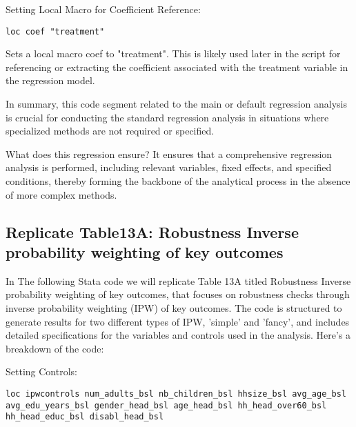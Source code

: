 \documentclass{article}
\begin{document}
\vspace{0.2cm}Setting Local Macro for Coefficient Reference:
\begin{mdframed}
\begin{verbatim}
loc coef "treatment"
\end{verbatim}
\end{mdframed}

\vspace{0.3cm}
Sets a local macro coef to "treatment". This is likely used later in the script for referencing or extracting the coefficient associated with the treatment variable in the regression model. \newline


In summary, this code segment related to the main or default regression analysis is crucial for conducting the standard regression analysis in situations where specialized methods are not required or specified.\newline

What does this regression ensure? \newline
It ensures that a comprehensive regression analysis is performed, including relevant variables, fixed effects, and specified conditions, thereby forming the backbone of the analytical process in the absence of more complex methods.

\subsection{Replicate Table13A: Robustness Inverse probability weighting of key outcomes}
\vspace{0.3cm} In The following Stata code we will replicate Table 13A titled Robustness Inverse probability weighting of key outcomes, that focuses on robustness checks through inverse probability weighting (IPW) of key outcomes. The code is structured to generate results for two different types of IPW, 'simple' and 'fancy', and includes detailed specifications for the variables and controls used in the analysis. \newline
Here's a breakdown of the code:

\vspace{0.2cm}Setting Controls:
\begin{mdframed}
\begin{verbatim}
loc ipwcontrols num_adults_bsl nb_children_bsl hhsize_bsl avg_age_bsl 
avg_edu_years_bsl gender_head_bsl age_head_bsl hh_head_over60_bsl 
hh_head_educ_bsl disabl_head_bsl
\end{verbatim}
\end{mdframed}
\end{document}
